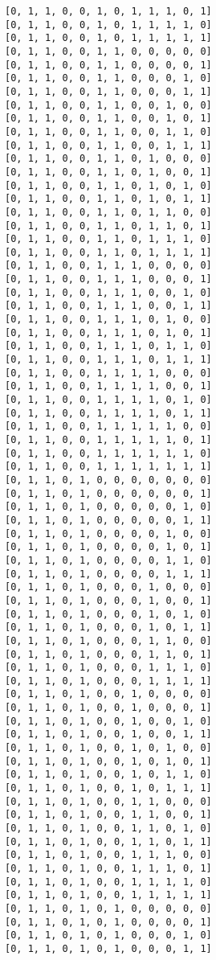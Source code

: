 \documentclass[11pt]{article}
\begin{document}
\begin{Verbatim}[commandchars=\\\{\}]
[0, 1, 1, 0, 0, 1, 0, 1, 1, 1, 0, 1]
[0, 1, 1, 0, 0, 1, 0, 1, 1, 1, 1, 0]
[0, 1, 1, 0, 0, 1, 0, 1, 1, 1, 1, 1]
[0, 1, 1, 0, 0, 1, 1, 0, 0, 0, 0, 0]
[0, 1, 1, 0, 0, 1, 1, 0, 0, 0, 0, 1]
[0, 1, 1, 0, 0, 1, 1, 0, 0, 0, 1, 0]
[0, 1, 1, 0, 0, 1, 1, 0, 0, 0, 1, 1]
[0, 1, 1, 0, 0, 1, 1, 0, 0, 1, 0, 0]
[0, 1, 1, 0, 0, 1, 1, 0, 0, 1, 0, 1]
[0, 1, 1, 0, 0, 1, 1, 0, 0, 1, 1, 0]
[0, 1, 1, 0, 0, 1, 1, 0, 0, 1, 1, 1]
[0, 1, 1, 0, 0, 1, 1, 0, 1, 0, 0, 0]
[0, 1, 1, 0, 0, 1, 1, 0, 1, 0, 0, 1]
[0, 1, 1, 0, 0, 1, 1, 0, 1, 0, 1, 0]
[0, 1, 1, 0, 0, 1, 1, 0, 1, 0, 1, 1]
[0, 1, 1, 0, 0, 1, 1, 0, 1, 1, 0, 0]
[0, 1, 1, 0, 0, 1, 1, 0, 1, 1, 0, 1]
[0, 1, 1, 0, 0, 1, 1, 0, 1, 1, 1, 0]
[0, 1, 1, 0, 0, 1, 1, 0, 1, 1, 1, 1]
[0, 1, 1, 0, 0, 1, 1, 1, 0, 0, 0, 0]
[0, 1, 1, 0, 0, 1, 1, 1, 0, 0, 0, 1]
[0, 1, 1, 0, 0, 1, 1, 1, 0, 0, 1, 0]
[0, 1, 1, 0, 0, 1, 1, 1, 0, 0, 1, 1]
[0, 1, 1, 0, 0, 1, 1, 1, 0, 1, 0, 0]
[0, 1, 1, 0, 0, 1, 1, 1, 0, 1, 0, 1]
[0, 1, 1, 0, 0, 1, 1, 1, 0, 1, 1, 0]
[0, 1, 1, 0, 0, 1, 1, 1, 0, 1, 1, 1]
[0, 1, 1, 0, 0, 1, 1, 1, 1, 0, 0, 0]
[0, 1, 1, 0, 0, 1, 1, 1, 1, 0, 0, 1]
[0, 1, 1, 0, 0, 1, 1, 1, 1, 0, 1, 0]
[0, 1, 1, 0, 0, 1, 1, 1, 1, 0, 1, 1]
[0, 1, 1, 0, 0, 1, 1, 1, 1, 1, 0, 0]
[0, 1, 1, 0, 0, 1, 1, 1, 1, 1, 0, 1]
[0, 1, 1, 0, 0, 1, 1, 1, 1, 1, 1, 0]
[0, 1, 1, 0, 0, 1, 1, 1, 1, 1, 1, 1]
[0, 1, 1, 0, 1, 0, 0, 0, 0, 0, 0, 0]
[0, 1, 1, 0, 1, 0, 0, 0, 0, 0, 0, 1]
[0, 1, 1, 0, 1, 0, 0, 0, 0, 0, 1, 0]
[0, 1, 1, 0, 1, 0, 0, 0, 0, 0, 1, 1]
[0, 1, 1, 0, 1, 0, 0, 0, 0, 1, 0, 0]
[0, 1, 1, 0, 1, 0, 0, 0, 0, 1, 0, 1]
[0, 1, 1, 0, 1, 0, 0, 0, 0, 1, 1, 0]
[0, 1, 1, 0, 1, 0, 0, 0, 0, 1, 1, 1]
[0, 1, 1, 0, 1, 0, 0, 0, 1, 0, 0, 0]
[0, 1, 1, 0, 1, 0, 0, 0, 1, 0, 0, 1]
[0, 1, 1, 0, 1, 0, 0, 0, 1, 0, 1, 0]
[0, 1, 1, 0, 1, 0, 0, 0, 1, 0, 1, 1]
[0, 1, 1, 0, 1, 0, 0, 0, 1, 1, 0, 0]
[0, 1, 1, 0, 1, 0, 0, 0, 1, 1, 0, 1]
[0, 1, 1, 0, 1, 0, 0, 0, 1, 1, 1, 0]
[0, 1, 1, 0, 1, 0, 0, 0, 1, 1, 1, 1]
[0, 1, 1, 0, 1, 0, 0, 1, 0, 0, 0, 0]
[0, 1, 1, 0, 1, 0, 0, 1, 0, 0, 0, 1]
[0, 1, 1, 0, 1, 0, 0, 1, 0, 0, 1, 0]
[0, 1, 1, 0, 1, 0, 0, 1, 0, 0, 1, 1]
[0, 1, 1, 0, 1, 0, 0, 1, 0, 1, 0, 0]
[0, 1, 1, 0, 1, 0, 0, 1, 0, 1, 0, 1]
[0, 1, 1, 0, 1, 0, 0, 1, 0, 1, 1, 0]
[0, 1, 1, 0, 1, 0, 0, 1, 0, 1, 1, 1]
[0, 1, 1, 0, 1, 0, 0, 1, 1, 0, 0, 0]
[0, 1, 1, 0, 1, 0, 0, 1, 1, 0, 0, 1]
[0, 1, 1, 0, 1, 0, 0, 1, 1, 0, 1, 0]
[0, 1, 1, 0, 1, 0, 0, 1, 1, 0, 1, 1]
[0, 1, 1, 0, 1, 0, 0, 1, 1, 1, 0, 0]
[0, 1, 1, 0, 1, 0, 0, 1, 1, 1, 0, 1]
[0, 1, 1, 0, 1, 0, 0, 1, 1, 1, 1, 0]
[0, 1, 1, 0, 1, 0, 0, 1, 1, 1, 1, 1]
[0, 1, 1, 0, 1, 0, 1, 0, 0, 0, 0, 0]
[0, 1, 1, 0, 1, 0, 1, 0, 0, 0, 0, 1]
[0, 1, 1, 0, 1, 0, 1, 0, 0, 0, 1, 0]
[0, 1, 1, 0, 1, 0, 1, 0, 0, 0, 1, 1]

\end{Verbatim}
\end{document}
